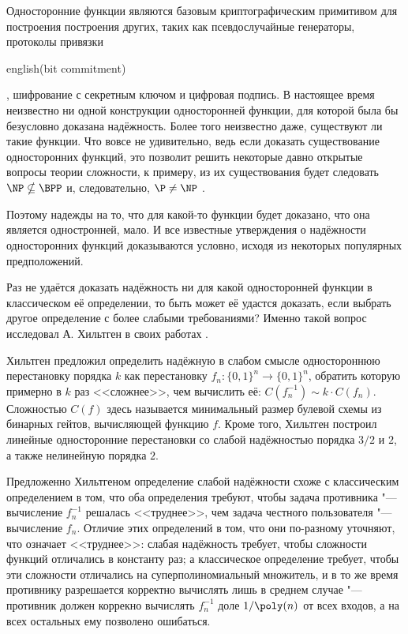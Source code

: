 \documentclass[oneside, a4paper]{article}
\theoremstyle{definition}
\theoremstyle{remark}
\begin{document}
Односторонние функции являются базовым криптографическим примитивом для
построения построения других, таких как псевдослучайные генераторы, протоколы
привязки \begin{foreignlanguage}{english}(bit commitment)\end{foreignlanguage},
шифрование с секретным ключом и цифровая подпись. В настоящее время неизвестно
ни одной конструкции односторонней функции, для которой была бы безусловно
доказана надёжность. Более того неизвестно даже, существуют ли такие функции.
Что вовсе не удивительно, ведь если доказать существование односторонних
функций, это позволит решить некоторые давно открытые вопросы теории
сложности, к примеру, из их существования будет следовать $\NP \nsubseteq
\BPP$ и, следовательно, $\P \neq \NP$ \cite{goldreich}.

Поэтому надежды на то, что для какой-то функции будет доказано, что она является
одностронней, мало. И все известные утверждения о надёжности односторонних
функций доказываются условно, исходя из некоторых популярных предположений.

Раз не удаётся доказать надёжность ни для какой односторонней функции в
классическом её определении, то быть может её удастся доказать, если выбрать
другое определение с более слабыми требованиями? Именно такой вопрос исследовал
А. Хильтген в своих работах \cite{hiltgen1993,hiltgen1994}.

Хильтген предложил определить надёжную в слабом смысле одностороннюю
перестановку порядка $k$ как перестановку $f_n : \{0, 1\}^n \to \{0, 1\}^n$,
обратить которую примерно в $k$ раз <<сложнее>>, чем вычислить её: $C(f_n^{-1})
\sim k \cdot C(f_n)$. Сложностью $C(f)$ здесь называется минимальный размер
булевой схемы из бинарных гейтов, вычисляющей функцию $f$. Кроме того, Хильтген
построил линейные односторонние перестановки со слабой надёжностью порядка $3/2$
и $2$, а также нелинейную порядка $2$.

Предложенно Хильтгеном определение слабой надёжности схоже с классическим
определением в том, что оба определения требуют, чтобы задача противника "---
вычисление $f_n^{-1}$ решалась <<труднее>>, чем задача честного пользователя
"--- вычисление $f_n$. Отличие этих определений в том, что они по-разному
уточняют, что означает <<труднее>>: слабая надёжность требует, чтобы сложности
функций отличались в константу раз; а классическое определение требует, чтобы
эти сложности отличались на суперполиномиальный множитель, и в то же время
противнику разрешается корректно вычислять лишь в среднем случае "--- противник
должен коррекно вычислять $f_n^{-1}$ доле $1 / \poly(n)$ от всех входов, а на
всех остальных ему позволено ошибаться.
\end{document}
